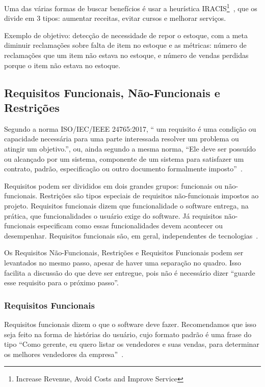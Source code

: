 \documentclass[a4]{report}
\begin{document}
Uma das várias formas de buscar benefícios é usar a heurística IRACIS\footnote{Increase Revenue, Avoid Costs and Improve Service}~\citep{gane:sarson:ssa,ruble_practical_1997}, que os divide em 3 tipos: aumentar receitas, evitar cursos e melhorar serviços.

Exemplo de objetivo: detecção de necessidade de repor o estoque, com a meta diminuir reclamações sobre falta de item no estoque e as métricas: número de reclamações que um item não estava no estoque, e número de vendas perdidas porque o item não estava no estoque.

\subsection{Requisitos Funcionais, Não-Funcionais e Restrições}

Segundo a norma ISO/IEC/IEEE 24765:2017, `` um requisito é uma condição ou capacidade necessária para uma parte interessada resolver um problema ou atingir um objetivo.'', ou, ainda segundo a mesma norma, ``Ele deve ser possuído ou alcançado por um sistema, componente de um sistema para satisfazer um contrato, padrão, especificação ou outro documento formalmente imposto''~\citep{IEEE:24765:2017}.

Requisitos podem ser divididos em dois grandes grupos: funcionais ou não-funcionais. Restrições são tipos especiais de requisitos não-funcionais impostos ao projeto. Requisitos funcionais dizem que funcionalidade o software entrega, na prática, que funcionalidades o usuário exige do software. Já requisitos não-funcionais especificam como essas funcionalidades devem acontecer ou desempenhar. Requisitos funcionais são, em geral, independentes de tecnologias~\cite{essential:palmer}.

Os Requisitos Não-Funcionais, Restrições e Requisitos Funcionais podem ser levantados no mesmo passo, apesar de haver uma separação no quadro. Isso facilita a discussão do que deve ser entregue, pois não é necessário dizer ``guarde esse requisito para o próximo passo''.

\subsubsection{Requisitos Funcionais}

Requisitos funcionais dizem o que o software deve fazer. Recomendamos que isso seja feito na forma de histórias do usuário, cujo formato padrão é uma frase do tipo ``Como gerente, eu quero listar os vendedores e suas vendas, para determinar os melhores vendedores da empresa''~\citep{mike:user:stories}.
\end{document}
